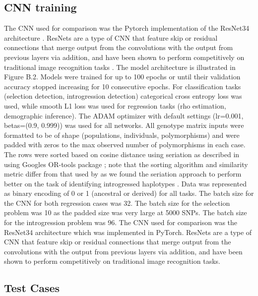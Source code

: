 \subsection{CNN training}
The CNN used for comparison was the Pytorch \cite{paszkePyTorchImperativeStyle2019} implementation of the ResNet34 architecture \cite{heDeepResidualLearning2015}. ResNets are a type of CNN that feature skip or residual connections that merge output from the convolutions with the output from previous layers via addition, and have been shown to perform competitively on traditional image recognition tasks \cite{reddiMLPerfInferenceBenchmark2020}. The model architecture is illustrated in Figure B.2. Models were trained for up to 100 epochs or until their validation accuracy stopped increasing for 10 consecutive epochs. For classification tasks (selection detection, introgression detection) categorical cross entropy loss was used, while smooth L1 \cite{girshickFastRCNN2015} loss was used for regression tasks (rho estimation, demographic inference). The ADAM optimizer with default settings (lr=0.001, betas=(0.9, 0.999)) \cite{kingmaAdamMethodStochastic2017} was used for all networks. All genotype matrix inputs were formatted to be of shape (populations, individuals, polymorphisms) and were padded with zeros to the max observed number of polymorphisms in each case. The rows were sorted based on cosine distance using seriation as described in \cite{rayIntroUNETIdentifyingIntrogressed2023} using Googles OR-tools package \cite{perronORTools2019}; note that the sorting algorithm and similarity metric differ from that used by \cite{flagelUnreasonableEffectivenessConvolutional2019} as we found the seriation approach to perform better on the task of identifying introgressed haplotypes \cite{rayIntroUNETIdentifyingIntrogressed2023}. Data was represented as binary encoding of 0 or 1 (ancestral or derived) for all tasks. 
The batch size for the CNN for both regression cases was 32. The batch size for the selection problem was 10 as the padded size was very large at 5000 SNPs. The batch size for the introgression problem was 96. The CNN used for comparison was the ResNet34 architecture \cite{heDeepResidualLearning2015} which was implemented in PyTorch. ResNets are a type of CNN that feature skip or residual connections that merge output from the convolutions with the output from previous layers via addition, and have been shown to perform competitively on traditional image recognition tasks. 

\subsection{Test Cases}
